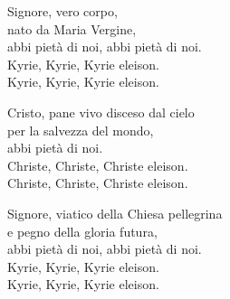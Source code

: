 
\strofa Signore, vero corpo,\\
nato da Maria Vergine,\\
abbi pietà di noi, abbi pietà di noi.\\
Kyrie, Kyrie, Kyrie eleison.\\
Kyrie, Kyrie, Kyrie eleison.

\spazio

\strofa Cristo, pane vivo disceso dal cielo\\
per la salvezza del mondo,\\
abbi pietà di noi.\\
Christe, Christe, Christe eleison.\\
Christe, Christe, Christe eleison.

\spazio

\strofa Signore, viatico della Chiesa pellegrina\\
e pegno della gloria futura,\\
abbi pietà di noi, abbi pietà di noi.\\
Kyrie, Kyrie, Kyrie eleison.\\
Kyrie, Kyrie, Kyrie eleison.